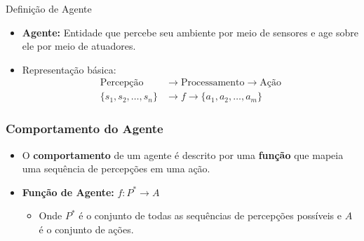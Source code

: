 \documentclass{beamer}
\begin{document}
\begin{frame}{Definição de Agente}
    \begin{itemize}
        \item \textbf{Agente:} Entidade que percebe seu ambiente por meio de sensores e age sobre ele por meio de atuadores.
        \item Representação básica:
        \begin{align*}
            \text{Percepção} & \rightarrow \text{Processamento} \rightarrow \text{Ação} \\
            \{s_1, s_2, \ldots, s_n\} & \rightarrow f \rightarrow \{a_1, a_2, \ldots, a_m\}
        \end{align*}
    \end{itemize}
    \begin{center}
    \end{center}
\end{frame}

\begin{frame}
\frametitle{Comportamento do Agente}
\begin{itemize}
    \item O \textbf{comportamento} de um agente é descrito por uma \textbf{função} que mapeia uma sequência de percepções em uma ação.
    \item \textbf{Função de Agente:} $f: P^* \rightarrow A$
    \begin{itemize}
        \item Onde $P^*$ é o conjunto de todas as sequências de percepções possíveis e $A$ é o conjunto de ações.
    \end{itemize}
\end{itemize}
\end{frame}
\end{document}
